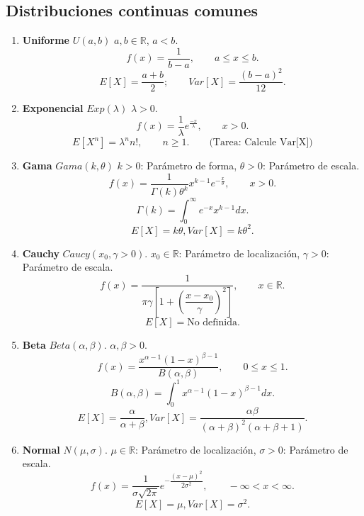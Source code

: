 \documentclass[11pt]{report}
\theoremstyle{break}
\theoremstyle{break}
\begin{document}
\subsection{Distribuciones continuas comunes}
\label{seccion:Distribuciones continuas comunas}
\begin{enumerate}[label=\alph*)]
\item \textbf{Uniforme} $U(a,b)$
$a,b \in \mathbb{R}$, $a < b$.
$$
f(x) = \dfrac{1}{b-a}, \qquad a\leq x \leq b.
$$
$$
E[X] = \dfrac{a + b}{2}; \qquad Var[X] = \dfrac{(b - a)^2}{12}.
$$

\item \textbf{Exponencial} $Exp(\lambda)$
$\lambda > 0$.
$$
f(x) = \dfrac{1}{\lambda} e^{\frac{-x}{\lambda} }, \qquad x >0.
$$
$$
E[X^n] = \lambda^{n}n!, \qquad n \geq 1. \qquad \mbox{(Tarea: Calcule Var[X])}
$$

\item \textbf{Gama} $Gama(k, \theta)$
$k>0$: Parámetro de forma, $\theta>0$: Parámetro de escala.
$$
f(x) = \dfrac{1}{\Gamma(k) \theta^{k}} x^{k - 1} e^{-\frac{x}{\theta}}, \qquad x>0.
$$
$$
\Gamma(k) = \int_{0}^{\infty}e^{-x}x^{k-1}dx.
$$
$$
E[X] = k\theta, Var[X] = k\theta^{2}.
$$

\item \textbf{Cauchy} $Caucy(x_0, \gamma > 0)$. $x_0 \in \mathbb{R}$: Parámetro de localización, $\gamma > 0$: Parámetro de escala.
$$
f(x) = \dfrac{1}{\pi \gamma \left[ 1 + \left( \dfrac{x - x_0}{\gamma} \right)^2 \right] }, \qquad x\in \mathbb{R}.
$$
$$
E[X]= \mbox{No definida}.
$$

\item \textbf{Beta} $Beta(\alpha, \beta)$. $\alpha, \beta > 0$.
$$
f(x) = \dfrac{x^{\alpha - 1} (1 - x)^{\beta - 1}} {B(\alpha, \beta)}, \qquad 0 \leq x \leq 1.
$$
$$
B(\alpha, \beta) = \int_{0}^{1}x^{\alpha - 1}(1 - x)^{\beta - 1}dx.
$$
$$
E[X] = \dfrac{\alpha}{ \alpha + \beta}, Var[X] = \dfrac{\alpha \beta}{ (\alpha + \beta)^2 (\alpha + \beta + 1)  }.
$$

\item \textbf{Normal} $N(\mu, \sigma)$. $\mu \in \mathbb{R}$: Parámetro de localización, $\sigma > 0$: Parámetro de escala.
$$
f(x) = \dfrac{1}{\sigma \sqrt{2 \pi} } e^{- \dfrac{ (x - \mu)^2 }{2 \sigma^2} }, \qquad -\infty < x < \infty.
$$
$$
E[X] = \mu, Var[X] = \sigma^2.
$$
\end{enumerate}
\end{document}
